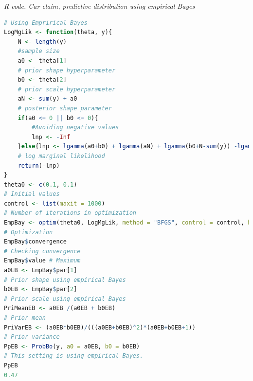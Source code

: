 \begin{enumerate}[leftmargin=*]
\begin{tcolorbox}[enhanced,width=4.67in,center upper,
	fontupper=\large\bfseries,drop shadow southwest,sharp corners]
	\textit{R code. Car claim, predictive distribution using empirical Bayes}
\begin{VF}
\begin{lstlisting}[language=R]
# Using Emprirical Bayes
LogMgLik <- function(theta, y){
	N <- length(y) 
	#sample size
	a0 <- theta[1] 
	# prior shape hyperparameter
	b0 <- theta[2] 
	# prior scale hyperparameter
	aN <- sum(y) + a0 
	# posterior shape parameter
	if(a0 <= 0 || b0 <= 0){ 
		#Avoiding negative values
		lnp <- -Inf
	}else{lnp <- lgamma(a0+b0) + lgamma(aN) + lgamma(b0+N-sum(y)) -lgamma(a0) - lgamma(b0) - lgamma(a0+b0+N)} 
	# log marginal likelihood
	return(-lnp)
}
theta0 <- c(0.1, 0.1) 
# Initial values
control <- list(maxit = 1000) 
# Number of iterations in optimization
EmpBay <- optim(theta0, LogMgLik, method = "BFGS", control = control, hessian = TRUE, y = y) 
# Optimization
EmpBay$convergence 
# Checking convergence
EmpBay$value # Maximum
a0EB <- EmpBay$par[1] 
# Prior shape using empirical Bayes
b0EB <- EmpBay$par[2] 
# Prior scale using empirical Bayes
PriMeanEB <- a0EB /(a0EB + b0EB)  
# Prior mean
PriVarEB <- (a0EB*b0EB)/(((a0EB+b0EB)^2)*(a0EB+b0EB+1)) 
# Prior variance
PpEB <- ProbBo(y, a0 = a0EB, b0 = b0EB)
# This setting is using empirical Bayes.
PpEB
0.47
\end{lstlisting}
\end{VF}
\end{tcolorbox}



\end{enumerate}
